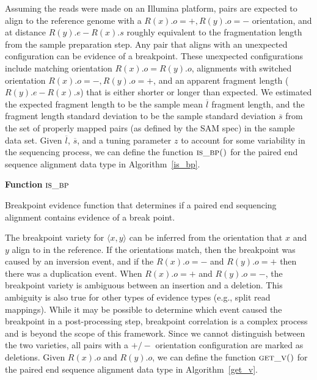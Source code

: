 \documentclass[11pt]{article}
\begin{document}
Assuming the reads were made on an Illumina platform, pairs are expected to
align to the reference genome with a $R(x).o=+, R(y).o=-$ orientation, and at
distance $R(y).e - R(x).s$ roughly equivalent to the fragmentation length from
the sample preparation step.  Any pair that aligns with an unexpected
configuration can be evidence of a breakpoint.  These unexpected configurations
include matching orientation $R(x).o = R(y).o$, alignments with switched
orientation $R(x).o=-, R(y).o=+$, and an apparent fragment length ($R(y).e -
R(x).s$) that is either shorter or longer than expected.  We estimated the
expected fragment length to be the sample mean $\overline{l}$ fragment length,
and the fragment length standard deviation to be the sample standard deviation
$\overline{s}$ from the set of properly mapped pairs (as defined by the SAM
spec) in the sample data set.  Given $\overline{l}$, $\overline{s}$, and a
tuning parameter $z$ to account for some variability in the sequencing process,
we can define the function $\textsc{is\_bp()}$ for the paired end sequence
alignment data type in Algorithm~\ref{is_bp}.

\begin{algorithm}[H]
    \DontPrintSemicolon
    \footnotesize
    \BlankLine
    \textbf{Function} $\textsc{is\_bp}$\;
	\caption{Breakpoint evidence function that determines if a paired end
			 sequencing alignment contains evidence of a break point.}
    \label{is_bp}
\end{algorithm}

The breakpoint variety for $\langle x,y \rangle$ can be inferred from the 
orientation that $x$ and $y$ align to in the reference.  If the orientations
match, then the breakpoint was caused by an inversion event, and if the
$R(x).o=-$ and $R(y).o=+$ then there was a duplication event.  When $R(x).o=+$
and $R(y).o=-$, the breakpoint variety is ambiguous between an insertion and a
deletion.  This ambiguity is also true for other types of evidence types (e.g.,
split read mappings).  While it may be possible to determine which event caused
the breakpoint in a post-processing step, breakpoint correlation is a complex
process and is beyond the scope of this framework.  Since we cannot distinguish
between the two varieties, all pairs with a $+/-$ orientation configuration are
marked as deletions.  Given $R(x).o$ and $R(y).o$, we can define the
function $\textsc{get\_v()}$ for the paired end sequence alignment
data type in Algorithm~\ref{get_v}.
\end{document}
